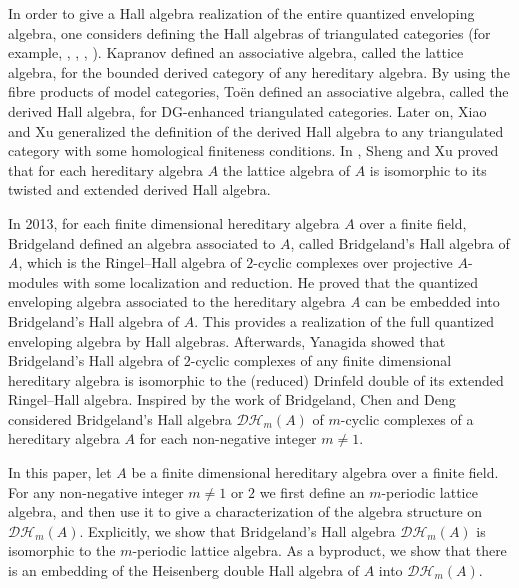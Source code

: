 \documentclass[reqno,12pt]{amsart}
\numberwithin{equation}{section}
\theoremstyle{plain}
\theoremstyle{definition}
\begin{document}
In order to give a Hall algebra realization of the entire quantized enveloping algebra, one considers defining the Hall algebras of triangulated categories (for example, \cite{Kapranov}, \cite{Toen}, \cite{Xiao}, \cite{XiaoXu}).
Kapranov \cite{Kapranov} defined an associative algebra, called the lattice algebra, for the bounded derived category of any hereditary algebra. By using the fibre products of model categories, To\"{e}n \cite{Toen} defined an associative algebra, called the derived Hall algebra, for DG-enhanced triangulated categories.
Later on, Xiao and Xu \cite{XiaoXu} generalized the definition of the derived Hall algebra to any triangulated category with some homological finiteness conditions. In \cite{SX}, Sheng and Xu proved that for each hereditary algebra $A$ the lattice algebra of $A$ is isomorphic to its twisted and extended derived Hall algebra.

In 2013, for each finite dimensional hereditary algebra $A$ over a finite field, Bridgeland \cite{Br} defined an algebra associated to $A$, called Bridgeland's Hall algebra of \emph{A}, which is the Ringel--Hall algebra of $2$-cyclic complexes over projective $A$-modules with some localization and reduction. He proved that the quantized enveloping algebra associated to the hereditary algebra \emph{A} can be embedded into Bridgeland's Hall algebra of $A$. This provides a realization of the full quantized enveloping algebra by Hall algebras. Afterwards, Yanagida \cite{Yan} showed that Bridgeland's Hall algebra of $2$-cyclic complexes of any finite dimensional hereditary algebra is isomorphic to the (reduced) Drinfeld double of its extended Ringel--Hall algebra. Inspired by the work of Bridgeland, Chen and Deng \cite{ChenD} considered Bridgeland's Hall algebra $\mathcal {D}\mathcal {H}_m(A)$ of $m$-cyclic complexes of a hereditary algebra $A$ for each non-negative integer $m\neq1$.

In this paper, let $A$ be a finite dimensional hereditary algebra over a finite field. For any non-negative integer $m\neq1$ or $2$ we first define an $m$-periodic lattice algebra, and then use it to give a characterization of the algebra structure on $\mathcal {D}\mathcal {H}_m(A)$. Explicitly, we show that Bridgeland's Hall algebra $\mathcal {D}\mathcal {H}_m(A)$ is isomorphic to the $m$-periodic lattice algebra. As a byproduct, we show that there is an embedding of the Heisenberg double Hall algebra of $A$ into $\mathcal {D}\mathcal {H}_m(A)$.
\end{document}
